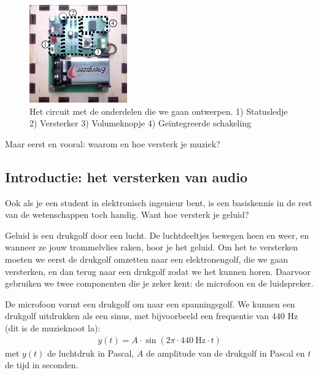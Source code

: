 \documentclass{article}
\begin{document}
		\begin{figure}[htbp]
				\centering
				\includegraphics[scale=3]{pcb}
				\caption{Het circuit met de onderdelen die we gaan ontwerpen. 1) Statusledje 2) Versterker 3) Volumeknopje 4) Ge\"integreerde schakeling}
				\label{fig:pcb}
			\end{figure}


		Maar eerst en vooral: waarom en hoe versterk je muziek?

		\subsection{Introductie: het versterken van audio}

			Ook als je een student in elektronisch ingenieur bent, is een basiskennis in de rest van de wetenschappen toch handig. Want hoe versterk je geluid?

			Geluid is een drukgolf door een lucht. De luchtdeeltjes bewegen heen en weer, en wanneer ze jouw trommelvlies raken, hoor je het geluid. Om het te versterken moeten we eerst de drukgolf omzetten naar een elektronengolf, die we gaan versterken, en dan terug naar een drukgolf zodat we het kunnen horen. Daarvoor gebruiken we twee componenten die je zeker kent: de microfoon en de luidspreker.



			De microfoon vormt een drukgolf om naar een spanningsgolf. We kunnen een drukgolf uitdrukken als een sinus, met bijvoorbeeld een frequentie van $440$ Hz (dit is de muzieknoot la):
			\begin{align}
				y(t) = A \cdot \sin (2\pi \cdot 440~\text{Hz} \cdot t)
			\end{align}
			met $y(t)$ de luchtdruk in Pascal, $A$ de amplitude van de drukgolf in Pascal en $t$ de tijd in seconden.
\end{document}
